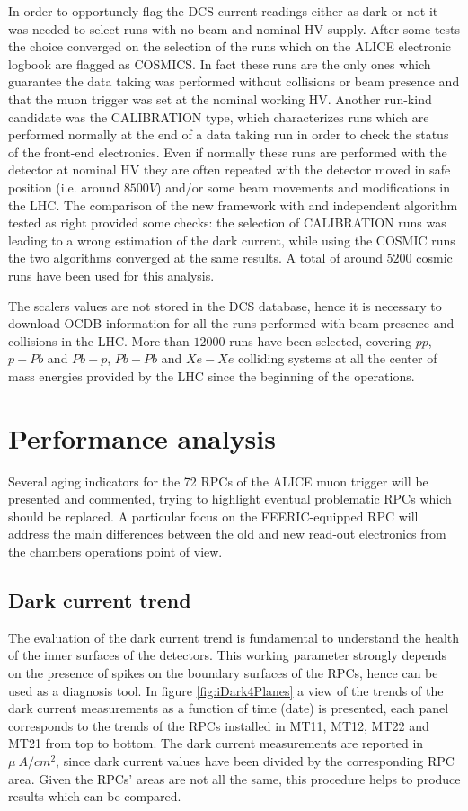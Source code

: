 In order to opportunely flag the DCS current readings either as dark or not it was needed to select runs with no beam and nominal HV supply.
After some tests the choice converged on the selection of the runs which on the ALICE electronic logbook are flagged as COSMICS.
In fact these runs are the only ones which guarantee the data taking was performed without collisions or beam presence and that the muon trigger was set at the nominal working HV.
Another run-kind candidate was the CALIBRATION type, which characterizes runs which are performed normally at the end of a data taking run in order to check the status of the front-end electronics.
Even if normally these runs are performed with the detector at nominal HV they are often repeated with the detector moved in safe position (i.e. around $8500V$) and/or some beam movements and modifications in the LHC.
The comparison of the new framework with and independent algorithm tested as right provided some checks: the selection of CALIBRATION runs was leading to a wrong estimation of the dark current, while using the COSMIC runs the two algorithms converged at the same results.
A total of around $5200$ cosmic runs have been used for this analysis.

The scalers values are not stored in the DCS database, hence it is necessary to download OCDB information for all the runs performed with beam presence and collisions in the LHC.
More than $12000$ runs have been selected, covering $pp$, $p-Pb$ and $Pb-p$, $Pb-Pb$ and $Xe-Xe$ colliding systems at all the center of mass energies provided by the LHC since the beginning of the operations.

\section{Performance analysis}
Several aging indicators for the 72 RPCs of the ALICE muon trigger will be presented and commented, trying to highlight eventual problematic RPCs which should be replaced.
A particular focus on the FEERIC-equipped RPC will address the main differences between the old and new read-out electronics from the chambers operations point of view.

\subsection{Dark current trend}
The evaluation of the dark current trend is fundamental to understand the health of the inner surfaces of the detectors.
This working parameter strongly depends on the presence of spikes on the boundary surfaces of the RPCs, hence can be used as a diagnosis tool.
In figure \ref{fig:iDark4Planes} a view of the trends of the dark current measurements as a function of time (date) is presented, each panel corresponds to the trends of the RPCs installed in MT11, MT12, MT22 and MT21 from top to bottom.
The dark current measurements are reported in $\mu~A/cm^2$, since dark current values have been divided by the corresponding RPC area.
Given the RPCs' areas are not all the same, this procedure helps to produce results which can be compared.

